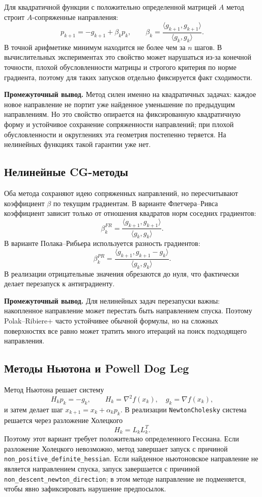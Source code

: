 \documentclass[14pt,a4paper]{extarticle}
\begin{document}
Для квадратичной функции с положительно определенной матрицей $A$ метод строит $A$-сопряженные направления:
\[
    p_{k+1}=-g_{k+1}+\beta_k p_k,\qquad
    \beta_k=\frac{\langle g_{k+1},g_{k+1}\rangle}{\langle g_k,g_k\rangle}.
\]
В точной арифметике минимум находится не более чем за $n$ шагов. В вычислительных экспериментах это свойство может нарушаться из-за конечной точности, плохой обусловленности матрицы и строгого критерия по норме градиента, поэтому для таких запусков отдельно фиксируется факт сходимости.

\textbf{Промежуточный вывод.} Метод силен именно на квадратичных задачах: каждое новое направление не портит уже найденное уменьшение по предыдущим направлениям. Но это свойство опирается на фиксированную квадратичную форму и устойчивое сохранение сопряженности направлений; при плохой обусловленности и округлениях эта геометрия постепенно теряется. На нелинейных функциях такой гарантии уже нет.

\subsection{Нелинейные CG-методы}

Оба метода сохраняют идею сопряженных направлений, но пересчитывают коэффициент $\beta$ по текущим градиентам. В варианте Флетчера--Ривса коэффициент зависит только от отношения квадратов норм соседних градиентов:
\[
    \beta_k^{FR}=
    \frac{\langle g_{k+1},g_{k+1}\rangle}{\langle g_k,g_k\rangle}.
\]
В варианте Полака--Рибьера используется разность градиентов:
\[
    \beta_k^{PR}=
    \frac{\langle g_{k+1},g_{k+1}-g_k\rangle}{\langle g_k,g_k\rangle}.
\]
В реализации отрицательные значения обрезаются до нуля, что фактически делает перезапуск к антиградиенту.

\textbf{Промежуточный вывод.} Для нелинейных задач перезапуски важны: накопленное направление может перестать быть направлением спуска. Поэтому Polak--Ribiere+ часто устойчивее обычной формулы, но на сложных поверхностях все равно может тратить много итераций на поиск подходящего направления.

\subsection{Методы Ньютона и Powell Dog Leg}

Метод Ньютона решает систему
\[
    H_kp_k=-g_k,\qquad H_k=\nabla^2 f(x_k),\quad g_k=\nabla f(x_k),
\]
и затем делает шаг $x_{k+1}=x_k+\alpha_kp_k$. В реализации \texttt{NewtonCholesky} система решается через разложение Холецкого
\[
    H_k=L_kL_k^T.
\]
Поэтому этот вариант требует положительно определенного Гессиана. Если разложение Холецкого невозможно, метод завершает запуск с причиной \texttt{non\_positive\_definite\_hessian}. Если найденное ньютоновское направление не является направлением спуска, запуск завершается с причиной \texttt{non\_descent\_newton\_direction}; в этом методе направление не подменяется, чтобы явно зафиксировать нарушение предпосылок.
\end{document}
